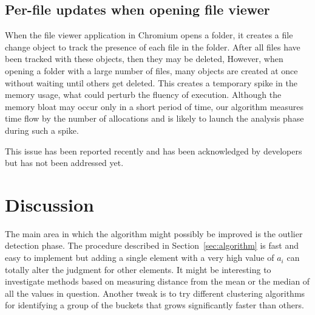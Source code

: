 \documentclass[preprint, numbers]{sigplanconf}
\begin{document}
\subsection{Per-file updates when opening file viewer \cite{bug-files}}

When the file viewer application in Chromium opens a folder, it creates a file change object to track the presence of each file in the folder.
After all files have been tracked with these objects, then they may be deleted,
However, when opening a folder with a large number of files, many objects are created at once
without waiting until others get deleted.
This creates a temporary spike in the memory usage, what could perturb the fluency of execution.
Although the memory bloat may occur only in a short period of time,
our algorithm measures time flow by the number of allocations and
is likely to launch the analysis phase during such a spike.

This issue has been reported recently and
has been acknowledged by developers but has not been addressed yet.

\section{Discussion}

The main area in which the algorithm might possibly be improved is
the outlier detection phase.
The procedure described in Section~\ref{sec:algorithm} is fast and easy to implement
but adding a single element with a very high value of $a_i$ can totally alter the judgment
for other elements.
It might be interesting to investigate methods based on measuring distance from the mean or the median
of all the values in question.
Another tweak is to try different clustering algorithms for identifying a group of the buckets that grows
significantly faster than others.






\end{document}
